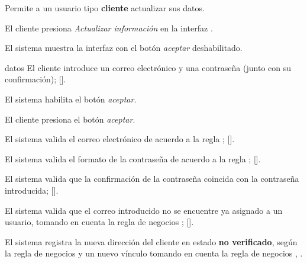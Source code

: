 %
%

{
  Permite a un usuario tipo \textbf{cliente} actualizar sus datos.

  \begin{trayectoriaPrincipal}

    \item El cliente presiona \textit{Actualizar información} en la
      interfaz .

    \item El sistema muestra la interfaz
       con el botón \textit{aceptar}
      deshabilitado.

    \item[datos] El cliente introduce un correo electrónico y una contraseña
      (junto con su confirmación); [].

    \item El sistema habilita el botón \textit{aceptar}.

    \item El cliente presiona el botón \textit{aceptar}.

    \item El sistema valida el correo electrónico de acuerdo a la regla
      ;
      [].

    \item El sistema valida el formato de la contraseña de acuerdo a la regla
      ;
      [].

    \item El sistema valida que la confirmación de la contraseña coincida con
      la contraseña introducida;
      [].

    \item El sistema valida que el correo introducido no se encuentre ya
      asignado a un usuario, tomando en cuenta la regla de negocios
      ;
      [].

    \item El sistema registra la nueva dirección del cliente en estado
      \textbf{no verificado}, según la regla de negocios
       y un nuevo vínculo tomando en cuenta
      la regla de negocios
      , .


\end{trayectoriaPrincipal}}
